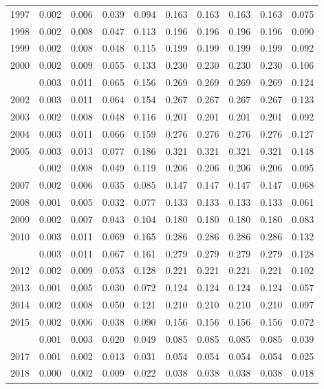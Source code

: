 \documentclass[
]{article}
\begin{document}
\begin{longtable}[t]{lrrrrrrrrr}
1997 & 0.002 & 0.006 & 0.039 & 0.094 & 0.163 & 0.163 & 0.163 & 0.163 & 0.075\\
1998 & 0.002 & 0.008 & 0.047 & 0.113 & 0.196 & 0.196 & 0.196 & 0.196 & 0.090\\
1999 & 0.002 & 0.008 & 0.048 & 0.115 & 0.199 & 0.199 & 0.199 & 0.199 & 0.092\\
2000 & 0.002 & 0.009 & 0.055 & 0.133 & 0.230 & 0.230 & 0.230 & 0.230 & 0.106\\
\addlinespace
2001 & 0.003 & 0.011 & 0.065 & 0.156 & 0.269 & 0.269 & 0.269 & 0.269 & 0.124\\
2002 & 0.003 & 0.011 & 0.064 & 0.154 & 0.267 & 0.267 & 0.267 & 0.267 & 0.123\\
2003 & 0.002 & 0.008 & 0.048 & 0.116 & 0.201 & 0.201 & 0.201 & 0.201 & 0.092\\
2004 & 0.003 & 0.011 & 0.066 & 0.159 & 0.276 & 0.276 & 0.276 & 0.276 & 0.127\\
2005 & 0.003 & 0.013 & 0.077 & 0.186 & 0.321 & 0.321 & 0.321 & 0.321 & 0.148\\
\addlinespace
2006 & 0.002 & 0.008 & 0.049 & 0.119 & 0.206 & 0.206 & 0.206 & 0.206 & 0.095\\
2007 & 0.002 & 0.006 & 0.035 & 0.085 & 0.147 & 0.147 & 0.147 & 0.147 & 0.068\\
2008 & 0.001 & 0.005 & 0.032 & 0.077 & 0.133 & 0.133 & 0.133 & 0.133 & 0.061\\
2009 & 0.002 & 0.007 & 0.043 & 0.104 & 0.180 & 0.180 & 0.180 & 0.180 & 0.083\\
2010 & 0.003 & 0.011 & 0.069 & 0.165 & 0.286 & 0.286 & 0.286 & 0.286 & 0.132\\
\addlinespace
2011 & 0.003 & 0.011 & 0.067 & 0.161 & 0.279 & 0.279 & 0.279 & 0.279 & 0.128\\
2012 & 0.002 & 0.009 & 0.053 & 0.128 & 0.221 & 0.221 & 0.221 & 0.221 & 0.102\\
2013 & 0.001 & 0.005 & 0.030 & 0.072 & 0.124 & 0.124 & 0.124 & 0.124 & 0.057\\
2014 & 0.002 & 0.008 & 0.050 & 0.121 & 0.210 & 0.210 & 0.210 & 0.210 & 0.097\\
2015 & 0.002 & 0.006 & 0.038 & 0.090 & 0.156 & 0.156 & 0.156 & 0.156 & 0.072\\
\addlinespace
2016 & 0.001 & 0.003 & 0.020 & 0.049 & 0.085 & 0.085 & 0.085 & 0.085 & 0.039\\
2017 & 0.001 & 0.002 & 0.013 & 0.031 & 0.054 & 0.054 & 0.054 & 0.054 & 0.025\\
2018 & 0.000 & 0.002 & 0.009 & 0.022 & 0.038 & 0.038 & 0.038 & 0.038 & 0.018\\*
\end{longtable}
\end{document}
